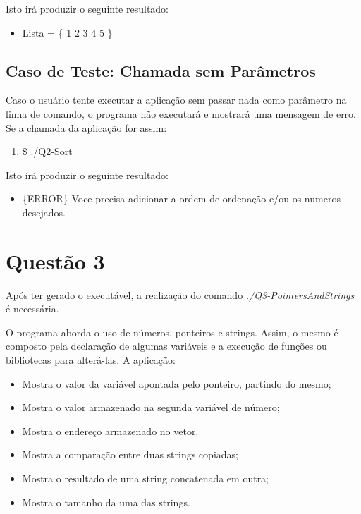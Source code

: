   Isto irá produzir o seguinte resultado:

  \begin{itemize}
    \item Lista = \{ 1 2 3 4 5 \}
  \end{itemize}

    \subsection{Caso de Teste: Chamada sem Parâmetros}

	  Caso o usuário tente executar a aplicação sem passar nada como parâmetro na linha de comando, o programa não
	  executará e mostrará uma mensagem de erro. Se a chamada da aplicação for assim:

	  \begin{enumerate}
	    \item \$ ./Q2-Sort
	  \end{enumerate}


	  Isto irá produzir o seguinte resultado:

	  \begin{itemize}
	    \item \{ERROR\} Voce precisa adicionar a ordem de ordenação e/ou os numeros desejados.
	  \end{itemize}

\section{Questão 3}

Após ter gerado o executável, a realização do comando \textit{./Q3-PointersAndStrings} é necessária.

O programa aborda o uso de números, ponteiros e strings. Assim, o mesmo é composto pela declaração de algumas variáveis
e a execução de funções ou bibliotecas para alterá-las. A aplicação:

\begin{itemize}
    \item Mostra o valor da variável apontada pelo ponteiro, partindo do mesmo;
    \item Mostra o valor armazenado na segunda variável de número;
    \item Mostra o endereço armazenado no vetor.

    \item Mostra a comparação entre duas strings copiadas;
    \item Mostra o resultado de uma string concatenada em outra;
    \item Mostra o tamanho da uma das strings.
  \end{itemize}

